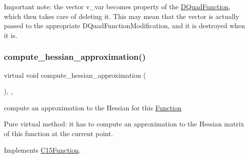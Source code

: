 Important note\+: the vector v\+\_\+var becomes property of the \mbox{\hyperlink{class_s_m_spp__di__unipi__it_1_1_d_quad_function}{D\+Quad\+Function}}, which then takes care of deleting it. This may mean that the vector is actually passed to the appropriate D\+Quad\+Function\+Modification, and it is destroyed when it is. \mbox{\label{class_s_m_spp__di__unipi__it_1_1_d_quad_function_a8f0ae6fd266900dca237c8c29b69cd5f}} 
\subsubsection{\texorpdfstring{compute\+\_\+hessian\+\_\+approximation()}{compute\_hessian\_approximation()}}
{\footnotesize\ttfamily virtual void compute\+\_\+hessian\+\_\+approximation (\begin{DoxyParamCaption}\item[{void}]{ }\end{DoxyParamCaption})\hspace{0.3cm}{\ttfamily [inline]}, {\ttfamily [override]}, {\ttfamily [virtual]}}



compute an approximation to the Hessian for this \mbox{\hyperlink{class_s_m_spp__di__unipi__it_1_1_function}{Function}} 

Pure virtual method\+: it has to compute an approximation to the Hessian matrix of this function at the current point. 

Implements \mbox{\hyperlink{class_s_m_spp__di__unipi__it_1_1_c15_function_a50c8f5b1802c658a795d266ba66e3c29}{C15\+Function}}.

\mbox{\label{class_s_m_spp__di__unipi__it_1_1_d_quad_function_aba06752e8038f74383bb0890735fc564}} 
